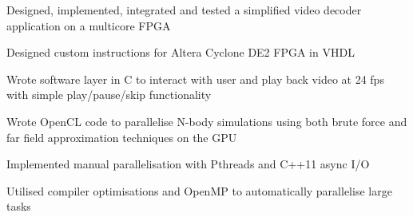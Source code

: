\documentclass[letterpaper]{deedy-resume} %
\begin{document}
\begin{minipage}[t]{0.66\textwidth}
\begin{tightitemize}
\item Designed, implemented, integrated and tested a simplified video decoder application on a multicore FPGA
\item Designed custom instructions for Altera Cyclone DE2 FPGA in VHDL
\item Wrote software layer in C to interact with user and play back video at 24 fps with simple play/pause/skip functionality
\end{tightitemize}

\begin{tightitemize}
\item Wrote OpenCL code to parallelise N-body simulations using both brute force and far field approximation techniques on the GPU
\item Implemented manual parallelisation with Pthreads and C++11 async I/O
\item Utilised compiler optimisations and OpenMP to automatically parallelise large tasks
\end{tightitemize}


\end{minipage} %








\end{document}
